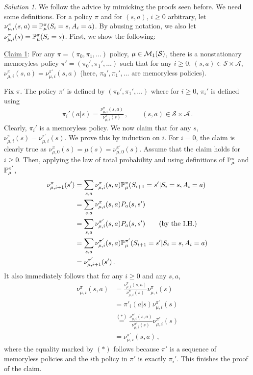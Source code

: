 \documentclass{article}
\DeclareMathOperator*{\1}{\mathbbm{1}}
\newcommand{\0}{\mathbf{0}}
\theoremstyle{definition}
\theoremstyle{remark}
\newtheorem*{solution*}{Solution}
\theoremstyle{theorem}
\newcommand{\cS}{\mathcal{S}}
\newcommand{\cA}{\mathcal{A}}
\begin{document}
\begin{solution*}
We follow the advice by mimicking the proofs seen before.
We need some definitions. 
For a policy $\pi$ and for $(s,a)$, $i\ge 0$ arbitrary, let
$\nu_{\mu,i}^\pi(s,a) = \mathbb{P}_\mu^\pi(S_i=s,A_i=a)$. By abusing notation, we also 
let $\nu_{\mu,i}^\pi(s) = \mathbb{P}_\mu^\pi(S_i=s)$.
First, we show the following:

\noindent \underline{Claim 1}: For any $\pi  = (\pi_0,\pi_1,\dots)$ policy, $\mu \in \cM_1(\cS)$, 
there is a nonstationary memoryless policy $\pi'=(\pi_0',\pi_1',\dots)$ such that 
for any $i\ge 0$, $(s,a)\in \cS \times \cA$, $\nu_{\mu,i}^\pi(s,a) = \nu_{\mu,i}^{\pi'}(s,a)$
(here, $\pi_0',\pi_1',\dots$ are memoryless policies).

Fix $\pi$. The policy $\pi'$ is defined by $(\pi_0',\pi_1',\dots)$ where for $i\ge 0$,
$\pi_i'$ is defined using 
\begin{align*}
\pi_i'(a|s) = \frac{\nu^\pi_{\mu,i}(s,a)}{\nu^\pi_{\mu,i}(s)}\,, \qquad (s,a)\in \cS \times \cA\,.
\end{align*}
Clearly, $\pi_i'$ is a memoryless policy.
We now claim that for any $s$, $\nu_{\mu,i}^\pi(s) = \nu_{\mu,i}^{\pi'}(s)$.
We prove this by induction on $i$.
For $i=0$, the claim is clearly true as 
$\nu_{\mu,0}^\pi(s) = \mu(s)=\nu_{\mu,0}^{\pi'}(s)$.
Assume that the claim holds for $i\ge 0$.
Then, applying the law of total probability
and using definitions of $\mathbb{P}_\mu^\pi$ and $\mathbb{P}_\mu^{\pi'}$,
\begin{align*}
\nu_{\mu,i+1}^\pi(s')
&= \sum_{s,a} \nu_{\mu,i}^\pi(s,a) \PP_\mu^\pi(S_{i+1}=s'|S_i=s,A_i=a)\\
&= \sum_{s,a} \nu_{\mu,i}^\pi(s,a) P_a(s,s')\\
&= \sum_{s,a} \nu_{\mu,i}^{\pi'}(s,a) P_a(s,s') \tag{\text{by the I.H.}}\\
&= \sum_{s,a} \nu_{\mu,i}^{\pi'}(s,a) \PP_\mu^{\pi'}(S_{i+1}=s'|S_i=s,A_i=a)\\
& = \nu_{\mu,i+1}^{\pi'}(s')\,.
\end{align*}
It also immediately follows that for any $i\ge 0$ and any $s,a$,
\begin{align*}
\nu_{\mu,i}^\pi(s,a) 
& = \frac{\nu_{\mu,i}^\pi(s,a)}{\nu_{\mu,i}^\pi(s)} \nu_{\mu,i}^\pi(s) \\
& = \pi'_i(a|s) \nu_{\mu,i}^{\pi'}(s) \\
& 
\stackrel{(*)}{=} 
\frac{\nu_{\mu,i}^{\pi'}(s,a)}{\nu_{\mu,i}^{\pi'}(s)}\nu_{\mu,i}^{\pi'}(s) \\
& = \nu_{\mu,i}^{\pi'}(s,a)\,,
\end{align*}
where the equality marked by $(*)$ follows because $\pi'$ is a sequence of memoryless policies and the $i$th policy in $\pi'$ is exactly $\pi_i'$. This finishes the proof of the claim.


\end{solution*}
\end{document}
